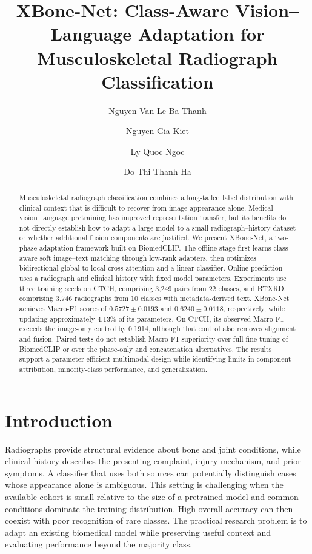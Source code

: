 \documentclass{llncs}
\begin{document}
\pagestyle{empty}
\title{XBone-Net: Class-Aware Vision--Language Adaptation for Musculoskeletal Radiograph Classification}
\author{Nguyen Van Le Ba Thanh \and Nguyen Gia Kiet \and Ly Quoc Ngoc \and Do Thi Thanh Ha}
\maketitle
\thispagestyle{empty}

\begin{abstract}
Musculoskeletal radiograph classification combines a long-tailed label distribution with clinical context that is difficult to recover from image appearance alone. Medical vision--language pretraining has improved representation transfer, but its benefits do not directly establish how to adapt a large model to a small radiograph--history dataset or whether additional fusion components are justified. We present XBone-Net, a two-phase adaptation framework built on BiomedCLIP. The offline stage first learns class-aware soft image--text matching through low-rank adapters, then optimizes bidirectional global-to-local cross-attention and a linear classifier. Online prediction uses a radiograph and clinical history with fixed model parameters. Experiments use three training seeds on CTCH, comprising 3,249 pairs from 22 classes, and BTXRD, comprising 3,746 radiographs from 10 classes with metadata-derived text. XBone-Net achieves Macro-F1 scores of $0.5727\pm0.0193$ and $0.6240\pm0.0118$, respectively, while updating approximately 4.13\% of its parameters. On CTCH, its observed Macro-F1 exceeds the image-only control by 0.1914, although that control also removes alignment and fusion. Paired tests do not establish Macro-F1 superiority over full fine-tuning of BiomedCLIP or over the phase-only and concatenation alternatives. The results support a parameter-efficient multimodal design while identifying limits in component attribution, minority-class performance, and generalization.
\end{abstract}

\section{Introduction}
Radiographs provide structural evidence about bone and joint conditions, while clinical history describes the presenting complaint, injury mechanism, and prior symptoms. A classifier that uses both sources can potentially distinguish cases whose appearance alone is ambiguous. This setting is challenging when the available cohort is small relative to the size of a pretrained model and common conditions dominate the training distribution. High overall accuracy can then coexist with poor recognition of rare classes. The practical research problem is to adapt an existing biomedical model while preserving useful context and evaluating performance beyond the majority class.
\end{document}
